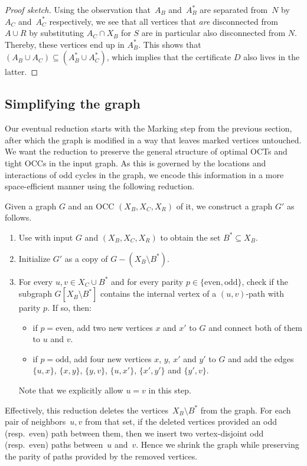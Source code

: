 \begin{proof}[Proof sketch]
 	Using the observation that~$A_B$ and~$A_B^\ast$ are separated from~$N$ by~$A_C$ and~$A_C^\ast$ respectively, we see that all vertices that \emph{are} disconnected from $A \cup R$ by substituting $A_C \cap X_B$ for $S$ are in particular also disconnected from $N$. Thereby, these vertices end up in $A_B^\ast$. This shows that $(A_B \cup A_C) \subseteq (A_B^\ast \cup A_C^\ast)$, which implies that the certificate $D$ also lives in the latter. 
\end{proof}

\subsection{Simplifying the graph} \label{ssec:shrinking:step:2}
Our eventual reduction starts with the Marking step from the previous section, after which the graph is modified in a way that leaves marked vertices untouched. We want the reduction to preserve the general structure of optimal OCTs and tight OCCs in the input graph. As this is governed by the locations and interactions of odd cycles in the graph, we encode this information in a more space-efficient manner using the following reduction.

\begin{reduction} \label{algo:shrink}
	Given a graph $G$ and an OCC $(X_B, X_C, X_R)$ of it, we construct a graph $G'$ as follows.
	\begin{enumerate}
		\item \label{itm:shrink:mark:b:star} Use  with input $G$ and $(X_B, X_C, X_R)$ to obtain the set $B^\ast \subseteq X_B$.
		\item Initialize $G'$ as a copy of $G - (X_B \setminus B^\ast)$.
		\item \label{itm:shrink:loop} For every $u, v \in X_C \cup B^\ast$ and for every parity $p \in \{\text{even}, \text{odd}\}$, check if the subgraph $G[X_B \setminus B^\ast]$ contains the internal vertex of a $(u,v)$-path with parity $p$. If so, then:
		\begin{itemize}
			\item if $p = \text{even}$, add two new vertices $x$ and $x'$ to $G$ and connect both of them to $u$ and $v$.
			\item if $p = \text{odd}$, add four new vertices $x$, $y$, $x'$ and $y'$ to $G$ and add the edges $\{u, x\}$, $\{x, y\}$, $\{y, v\}$, $\{u, x'\}$, $\{x', y'\}$ and $\{y', v\}$.
		\end{itemize}
		Note that we explicitly allow $u = v$ in this step. 
	\end{enumerate}
\end{reduction}
%
Effectively, this reduction deletes the vertices~$X_B \setminus B^\ast$ from the graph. For each pair of neighbors~$u,v$ from that set, if the deleted vertices provided an odd (resp.~even) path between them, then we insert two vertex-disjoint odd (resp.~even) paths between~$u$ and~$v$. Hence we shrink the graph while preserving the parity of paths provided by the removed vertices.

